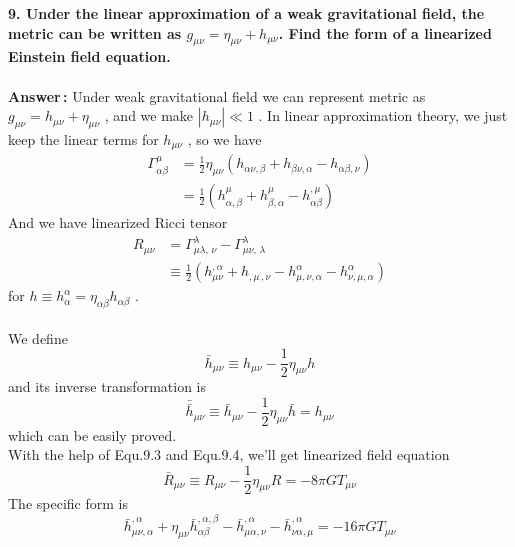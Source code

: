 \documentclass[12pt]{article}
\begin{document}
\textbf{9. Under the linear approximation of a weak gravitational field, the metric can be written as $g_{\mu\nu}=\eta_{\mu\nu}+h_{\mu\nu}$. Find the form of a linearized Einstein field equation.} \\	
~\\
\textbf{Answer\,:} Under weak gravitational field we can represent metric as $g_{\mu\nu}=h_{\mu\nu}+\eta_{\mu\nu}$ , and we make $|h_{\mu\nu}|\ll1$ . In linear approximation theory, we just keep the linear terms for $h_{\mu\nu}$ , so we have 	%
\begin{equation}
\begin{aligned}
\Gamma^{\mu}_{\alpha\beta} &= \frac{1}{2}\eta_{\mu\nu}(h_{\alpha\nu,\beta}+h_{\beta\nu,\alpha}-h_{\alpha\beta,\nu}) \\
&=\frac{1}{2}(h_{\alpha,\beta}^{\mu}+h_{\beta,\alpha}^{\mu}-h_{\alpha\beta}^{,\mu})
\end{aligned}
		\tag{9.1}
\end{equation}
And we have linearized Ricci tensor 
\begin{equation}
\begin{aligned}
R_{\mu\nu} &= \Gamma^{\lambda}_{\mu\lambda,\,\nu}-\Gamma^{\lambda}_{\mu\nu,\,\lambda} \\
&\equiv \frac{1}{2}(h^{,\alpha}_{\mu\nu}+h_{,\mu\,,\nu}-h^{\alpha}_{\mu,\nu,\alpha}-h^{\alpha}_{\nu,\mu,\alpha})
\end{aligned}
		\tag{9.2}
\end{equation}
for $h\equiv h^{\alpha}_{\alpha}=\eta_{\alpha\beta}h_{\alpha\beta}$ .\\
~\\
We define 
\begin{equation}
\bar h_{\mu\nu}\equiv h_{\mu\nu}-\frac{1}{2}\eta_{\mu\nu}h
		\tag{9.3}
\end{equation}
and its inverse transformation is 
\begin{equation}
 {\bar{\bar h}}_{\mu\nu} \equiv \bar h_{\mu\nu}-\frac{1}{2}\eta_{\mu\nu}\bar h=h_{\mu\nu}
		\tag{9.4}
\end{equation}
which can be easily proved. \\
With the help of Equ.9.3 and Equ.9.4, we'll get linearized field equation
\begin{equation}
\bar{R}_{\mu\nu} \equiv R_{\mu\nu}-\frac{1}{2}\eta_{\mu\nu}R=-8\pi GT_{\mu\nu}
		\tag{9.5(a)}
\end{equation}
The specific form is
\begin{equation}
\bar h^{,\alpha}_{\mu\nu,\alpha}+\eta_{\mu\nu} \bar{h}^{,\alpha,\beta}_{\alpha\beta}-\bar h^{,\alpha}_{\mu\alpha,\nu}-\bar h^{,\alpha}_{\nu\alpha,\mu}=-16\pi GT_{\mu\nu}
		\tag{9.5(b)}
\end{equation}
\end{document}
